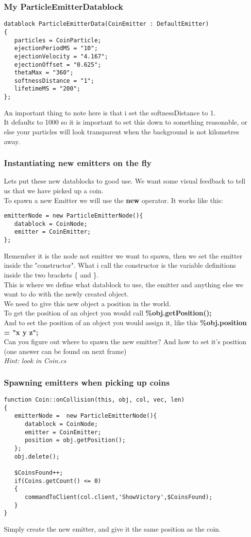 \begin{frame}[fragile]
\frametitle{My ParticleEmitterDatablock}
\TS
\begin{lstlisting}
datablock ParticleEmitterData(CoinEmitter : DefaultEmitter)
{
   particles = CoinParticle;
   ejectionPeriodMS = "10";
   ejectionVelocity = "4.167";
   ejectionOffset = "0.625";
   thetaMax = "360";
   softnessDistance = "1";
   lifetimeMS = "200";
};
\end{lstlisting}
An important thing to note here is that i set the softnessDistance to 1.\\
It defaults to 1000 so it is important to set this down to something reasonable, or else your particles will look transparent when the background is not kilometres away.
\end{frame}

\begin{frame}[fragile]
\frametitle{Instantiating new emitters on the fly}
Lets put these new datablocks to good use. We want some visual feedback to tell us that we have picked up a coin.\\
To spawn a new Emitter we will use the {\bf new} operator. It works like this:
\TS
\begin{lstlisting}
emitterNode = new ParticleEmitterNode(){
   datablock = CoinNode;
   emitter = CoinEmitter;
};
\end{lstlisting}
Remember it is the node not emitter we want to spawn, then we set the emitter inside the "constructor". What i call the constructor is
the variable definitions inside the two brackets \{ and \}.\\ 
This is where we define what datablock to use, the emitter and anything else we want to do with the newly created object.\\
We need to give this new object a position in the world.\\
To get the position of an object you would call {\bf \%obj.getPosition();}\\
And to set the position of an object you would assign it, like this {\bf \%obj.position = "x y z";}\\
Can you figure out where to spawn the new emitter? And how to set it's position (one answer can be found on next frame)\\
{\it Hint: look in Coin.cs}
\end{frame}

\begin{frame}[fragile]
\frametitle{Spawning emitters when picking up coins}
\TS
\begin{lstlisting}
function Coin::onCollision(this, obj, col, vec, len)
{
   emitterNode =  new ParticleEmitterNode(){
      datablock = CoinNode;
      emitter = CoinEmitter;
      position = obj.getPosition();
   };
   obj.delete();

   $CoinsFound++;
   if(Coins.getCount() <= 0)
   {
      commandToClient(col.client,'ShowVictory',$CoinsFound);
   }
}
\end{lstlisting}
Simply create the new emitter, and give it the same position as the coin.\\
\end{frame}

